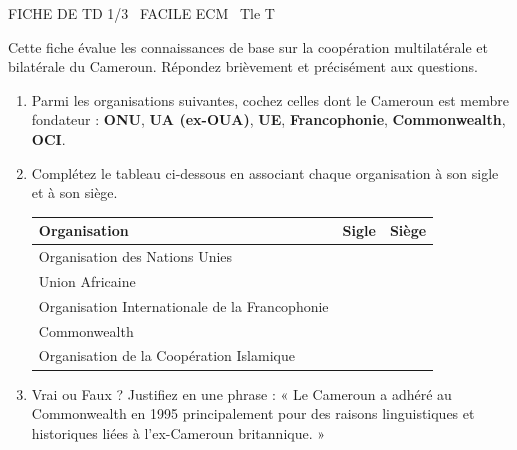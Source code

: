 \documentclass[11pt]{article}
\begin{document}
\begin{tcolorbox}[enhanced,colback=popink,colframe=popink,arc=10pt,boxrule=0pt,left=12pt,right=12pt,top=9pt,bottom=9pt]
{\color{white}\popxbold\small FICHE DE TD 1/3 \textbullet\ FACILE \hfill ECM \textbullet\ Tle T\par}
\end{tcolorbox}
\vspace{4pt}
Cette fiche évalue les connaissances de base sur la coopération multilatérale et bilatérale du Cameroun. Répondez brièvement et précisément aux questions.

\begin{exercice}
\begin{enumerate}
    \item Parmi les organisations suivantes, cochez celles dont le Cameroun est membre fondateur : \textbf{ONU}, \textbf{UA (ex-OUA)}, \textbf{UE}, \textbf{Francophonie}, \textbf{Commonwealth}, \textbf{OCI}.
    \item Complétez le tableau ci-dessous en associant chaque organisation à son sigle et à son siège.
    \begin{tabular}{|l|l|l|}
    \hline
    \textbf{Organisation} & \textbf{Sigle} & \textbf{Siège} \\
    \hline
    Organisation des Nations Unies & & \\
    \hline
    Union Africaine & & \\
    \hline
    Organisation Internationale de la Francophonie & & \\
    \hline
    Commonwealth & & \\
    \hline
    Organisation de la Coopération Islamique & & \\
    \hline
    \end{tabular}
    \item Vrai ou Faux ? Justifiez en une phrase : « Le Cameroun a adhéré au Commonwealth en 1995 principalement pour des raisons linguistiques et historiques liées à l'ex-Cameroun britannique. »
\end{enumerate}
\end{exercice}
\end{document}
